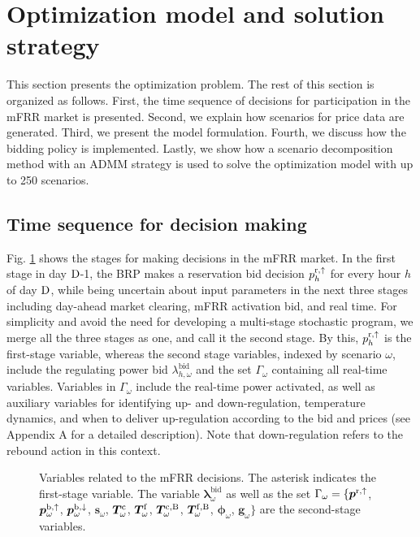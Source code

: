 \section{Optimization model and solution strategy}\label{sec:OptimizationModel}
%
This section presents the optimization problem. The rest of this section is organized as follows. First, the time sequence of decisions for participation in the mFRR market is presented. Second, we explain how scenarios for price data are generated. Third, we present the model formulation. Fourth, we discuss how the bidding policy is implemented. Lastly, we show how a scenario decomposition method with an ADMM strategy is used to solve the optimization model with up to 250 scenarios.

\vspace{-1mm}
\subsection{Time sequence for decision making}
Fig. \ref{fig:timeline_mfrr_variables} shows the stages for making decisions in the mFRR market. In the first stage in day $\rm{D}$-1, the BRP makes a reservation bid decision $p_{h}^{\rm{r},\uparrow}$ for every hour $h$ of day $\rm{D}$,  while being uncertain about input parameters in the next three stages including day-ahead market clearing, mFRR activation bid, and real time. For simplicity and avoid the need for developing a multi-stage stochastic program, we merge all the three stages as one, and call it the second stage. By this, $p_{h}^{\rm{r},\uparrow}$ is the first-stage variable, whereas the second stage variables, indexed by scenario $\omega$, include 
the regulating power bid $\lambda_{h,\omega}^{\text{bid}}$ and the set $\Gamma_{\omega}$ containing all real-time variables. Variables in $\Gamma_{\omega}$ include the real-time power activated, as well as auxiliary variables for identifying up- and down-regulation,  temperature dynamics, and when to deliver up-regulation according to the bid and prices (see Appendix A for a detailed description). Note that down-regulation refers to the rebound action in this context. 

\begin{figure}[b]
    \centering
    
    \caption{Variables related to the mFRR  decisions. The asterisk indicates the first-stage variable.  The variable $\bm{\lambda}_{\omega}^{\text{bid}}$ as well as the set $\Gamma_{\omega} = \{ \bm{p}^{\rm{r},\uparrow}$, $\bm{p}_{\omega}^{\rm{b},\uparrow}$, $\bm{p}_{\omega}^{\rm{b},\downarrow}$, $\bm{s}_{\omega}$, $\bm{T}_{\omega}^{\rm{c}}$, $\bm{T}_{\omega}^{\rm{f}}$, $\bm{T}_{\omega}^{\rm{c,B}}$, $\bm{T}_{\omega}^{\rm{f,B}}$, $\bm{\phi}_{\omega}$, $\bm{g}_{\omega} \}$ are the second-stage  variables.}
    \label{fig:timeline_mfrr_variables}
\end{figure}

